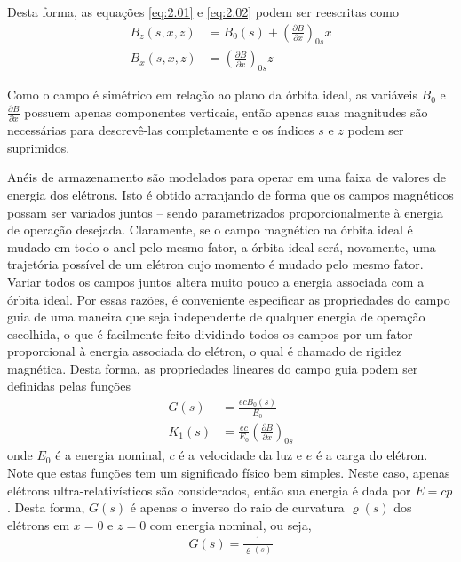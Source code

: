 Desta forma, as equações \eqref{eq:2.01} e \eqref{eq:2.02} podem ser reescritas como
\begin{align}
	B_z(s,x,z) &= B_0(s) + \left(\frac{\partial B}{\partial x}\right)_{0s} x\label{eq:2.1}\\
	B_x(s,x,z) &= \left(\frac{\partial B}{\partial x}\right)_{0s} z\label{eq:2.2}
\end{align}

Como o campo é simétrico em relação ao plano da órbita ideal, as variáveis $B_0$ e $\frac{\partial B}{\partial x}$ possuem apenas componentes verticais, então apenas suas magnitudes são necessárias para descrevê-las completamente e os índices $s$ e $z$ podem ser suprimidos.

Anéis de armazenamento são modelados para operar em uma faixa de valores de energia dos elétrons. Isto é obtido arranjando de forma que os campos magnéticos possam ser variados juntos -- sendo parametrizados proporcionalmente à energia de operação desejada. Claramente, se o campo magnético na órbita ideal é mudado em todo o anel pelo mesmo fator, a órbita ideal será, novamente, uma trajetória possível de um elétron cujo momento é mudado pelo mesmo fator. Variar todos os campos juntos altera muito pouco a energia associada com a órbita ideal. Por essas razões, é conveniente especificar as propriedades do campo guia de uma maneira que seja independente de qualquer energia de operação escolhida, o que é facilmente feito dividindo todos os campos por um fator proporcional à energia associada do elétron, o qual é chamado de rigidez magnética. Desta forma, as propriedades lineares do campo guia podem ser definidas pelas funções
\begin{align}
	G(s) &= \frac{ecB_0(s)}{E_0}\label{eq:2.3}\\
	K_1(s) &= \frac{ec}{E_0} \left(\frac{\partial B}{\partial x}\right)_{0s}
\end{align}
onde $E_0$ é a energia nominal, $c$ é a velocidade da luz e $e$ é a carga do elétron. Note que estas funções tem um significado físico bem simples. Neste caso, apenas elétrons ultra-relativísticos são considerados, então sua energia é dada por $E=cp$. Desta forma, $G(s)$ é apenas o inverso do raio de curvatura $\varrho(s)$ dos elétrons em $x=0$ e $z=0$ com energia nominal, ou seja,
\begin{align}
	G(s) = \frac{1}{\varrho(s)}
\end{align}

